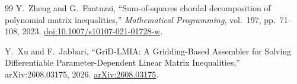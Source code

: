 \documentclass[11pt]{report}
\begin{document}
\begin{thebibliography}{99}
Y.~Zheng and G.~Fantuzzi, ``Sum-of-squares chordal decomposition of polynomial matrix inequalities,'' \emph{Mathematical Programming}, vol.~197, pp.~71--108, 2023. \href{https://doi.org/10.1007/s10107-021-01728-w}{doi:10.1007/s10107-021-01728-w}.

Y.~Xu and F.~Jabbari, ``GriD-LMIA: A Gridding-Based Assembler for Solving Differentiable Parameter-Dependent Linear Matrix Inequalities,'' arXiv:2608.03175, 2026. \href{https://arxiv.org/abs/2608.03175}{arXiv:2608.03175}.

\end{thebibliography}

\clearpage

\printindex
\end{document}
